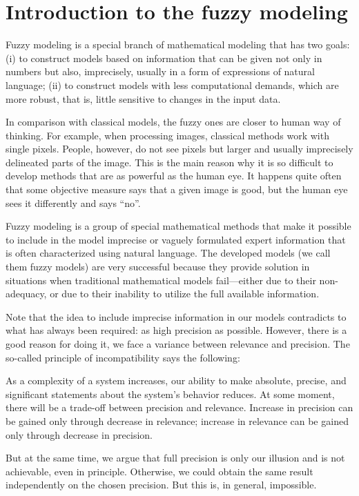 \chapter{Introduction to the fuzzy modeling}
Fuzzy modeling is a special branch of mathematical modeling that has two goals:
(i) to construct models based on information that can be given not only in numbers
but also, imprecisely, usually in a form of expressions of natural language; (ii) to
construct models with less computational demands, which are more robust, that is,
little sensitive to changes in the input data.

In comparison with classical models, the fuzzy ones are closer to human way of
thinking. For example, when processing images, classical methods work with single
pixels. People, however, do not see pixels but larger and usually imprecisely delineated parts of the image. This is the main reason why it is so difficult to develop
methods that are as powerful as the human eye. It happens quite often that some objective measure says that a given image is good, but the human eye sees it differently and
says “no”.

Fuzzy modeling is a group of special mathematical methods that make it possible to
include in the model imprecise or vaguely formulated expert information that is often
characterized using natural language. The developed models (we call them fuzzy
models) are very successful because they provide solution in situations when traditional mathematical models fail—either due to their non-adequacy, or due to their
inability to utilize the full available information.

Note that the idea to include imprecise information in our models contradicts to what has always been required: as high precision as possible. However, there is a good reason for doing it, we face a variance between relevance and precision. The so-called principle of incompatibility \cite{zadeh} says the following:

As a complexity of a system increases, our ability to make absolute, precise, and significant statements about the system's behavior reduces. At some moment, there will be a trade-off between precision and relevance. Increase in precision can be gained only through decrease in relevance; increase in relevance can be gained only through decrease in precision.

But at the same time, we argue that full precision is only our illusion and is not achievable, even in principle. Otherwise, we could obtain the same result independently on the chosen precision. But this is, in general, impossible. 


